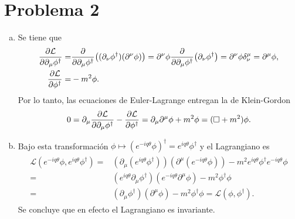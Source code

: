 \documentclass{article}
\begin{document}
\section*{Problema 2}

\begin{enumerate}[(a)]

\item Se tiene que
\begin{align}
\begin{split}
\pdv{\mathcal{L}}{\partial_\mu\phi^\dagger}=&\pdv{\partial_\mu\phi^\dagger}((\partial_\nu\phi^\dagger)(\partial^\nu\phi))=\partial^\nu\phi\pdv{\partial_\mu\phi^\dagger}(\partial_\nu\phi^\dagger)=\partial^\nu\phi\delta^\mu_\nu=\partial^\mu\phi,\\
\pdv{\mathcal{L}}{\phi^\dagger}=&-m^2\phi.
\end{split}
\end{align}
Por lo tanto, las ecuaciones de Euler-Lagrange entregan la de Klein-Gordon
\begin{equation}
0=\partial_\mu\pdv{\mathcal{L}}{\partial_\mu\phi^\dagger}-\pdv{\mathcal{L}}{\phi^\dagger}=\partial_\mu\partial^\mu\phi+m^2\phi=(\Box+m^2)\phi.
\end{equation}

\item Bajo esta transformación $\phi\mapsto (e^{-iq\theta}\phi)^\dagger=e^{iq\theta}\phi^\dagger$ y el Lagrangiano es
\begin{align}
\begin{split}
\mathcal{L}(e^{-iq\theta}\phi,e^{iq\theta}\phi^\dagger)=&(\partial_\mu(e^{iq\theta}\phi^\dagger))(\partial^\mu(e^{-iq\theta}\phi))-m^2e^{iq\theta}\phi^\dagger e^{-iq\theta}\phi\\
=&(e^{iq\theta}\partial_\mu\phi^\dagger)(e^{-iq\theta}\partial^\mu\phi)-m^2\phi^\dagger\phi\\
=&(\partial_\mu\phi^\dagger)(\partial^\mu\phi)-m^2\phi^\dagger\phi=\mathcal{L}(\phi,\phi^\dagger).
\end{split}
\end{align}
Se concluye que en efecto el Lagrangiano es invariante.


\end{enumerate}
\end{document}
